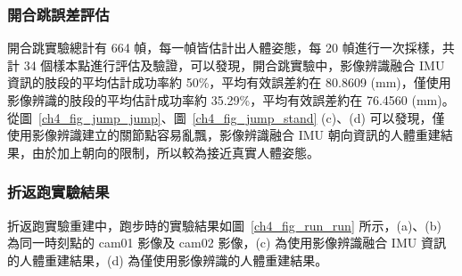 \subsubsection*{開合跳誤差評估}
開合跳實驗總計有 664 幀，每一幀皆估計出人體姿態，每 20 幀進行一次採樣，共計 34 個樣本點進行評估及驗證，可以發現，開合跳實驗中，影像辨識融合 IMU 資訊的肢段的平均估計成功率約 50\%，平均有效誤差約在 80.8609 (mm)，僅使用影像辨識的肢段的平均估計成功率約 35.29\%，平均有效誤差約在 76.4560 (mm)。從圖~\ref{ch4_fig_jump_jump}、圖~\ref{ch4_fig_jump_stand} (c)、(d) 可以發現，僅使用影像辨識建立的關節點容易亂飄，影像辨識融合 IMU 朝向資訊的人體重建結果，由於加上朝向的限制，所以較為接近真實人體姿態。

\clearpage

\subsubsection*{折返跑實驗結果}
折返跑實驗重建中，跑步時的實驗結果如圖~\ref{ch4_fig_run_run} 所示，(a)、(b) 為同一時刻點的 cam01 影像及 cam02 影像，(c) 為使用影像辨識融合 IMU 資訊的人體重建結果，(d) 為僅使用影像辨識的人體重建結果。

